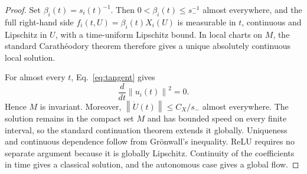 \documentclass[11pt]{article}
\newcommand{\norm}[1]{\left\lVert #1 \right\rVert}
\begin{document}
\begin{proof}
Set $\beta_i(t)=s_i(t)^{-1}$. Then $0<\beta_i(t)\le s_-^{-1}$ almost everywhere,
and the full right-hand side
$f_i(t,U)=\beta_i(t)X_i(U)$ is measurable in $t$, continuous and Lipschitz in
$U$, with a time-uniform Lipschitz bound. In local charts on $M$, the standard
Carath\'eodory theorem therefore gives a unique absolutely continuous local
solution.

For almost every $t$, Eq.~\eqref{eq:tangent} gives
\begin{equation}
\frac{d}{dt}\norm{u_i(t)}^2
=0.
\end{equation}
Hence $M$ is invariant. Moreover,
$\norm{\dot U(t)}\le C_X/s_-$ almost everywhere. The solution remains in the
compact set $M$ and has bounded speed on every finite interval, so the standard
continuation theorem extends it globally. Uniqueness and continuous dependence
follow from Gr\"onwall's inequality. ReLU requires no separate argument because
it is globally Lipschitz. Continuity of the coefficients in time gives a
classical solution, and the autonomous case gives a global flow.
\end{proof}
\end{document}
